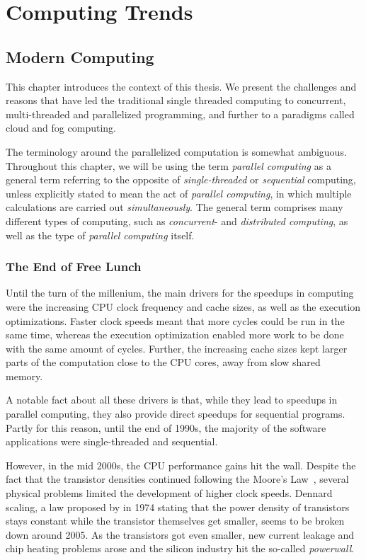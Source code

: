 \chapter{Computing Trends}
\label{chapter:computing-trends}

\section{Modern Computing}
This chapter introduces the context of this thesis. We present the challenges and reasons that have led the traditional single threaded computing to concurrent, multi-threaded and parallelized programming, and further to a paradigms called cloud and fog computing.

The terminology around the parallelized computation is somewhat ambiguous. Throughout this chapter, we will be using the term \emph{parallel computing} as a general term referring to the opposite of \emph{single-threaded} or \emph{sequential} computing, unless explicitly stated to mean the act of \emph{parallel computing}, in which multiple calculations are carried out \emph{simultaneously}. The general term comprises many different types of computing, such as \emph{concurrent}- and \emph{distributed computing}, as well as the type of \emph{parallel computing} itself.

\subsection{The End of Free Lunch}
\label{subsection:the-end-of-free-lunch}
Until the turn of the millenium, the main drivers for the speedups in computing were the increasing CPU clock frequency and cache sizes, as well as the execution optimizations. Faster clock speeds meant that more cycles could be run in the same time, whereas the execution optimization enabled more work to be done with the same amount of cycles. Further, the increasing cache sizes kept larger parts of the computation close to the CPU cores, away from slow shared memory.~\cite{Sutter:2005:FLiO}

A notable fact about all these drivers is that, while they lead to speedups in parallel computing, they also provide direct speedups for sequential programs. Partly for this reason, until the end of 1990s, the majority of the software applications were single-threaded and sequential.~\cite{Sutter:2005:FLiO}

However, in the mid 2000s, the CPU performance gains hit the wall. Despite the fact that the transistor densities continued following the Moore's Law~\cite{Moore:1998:MooresLaw}, several physical problems limited the development of higher clock speeds. Dennard scaling, a law proposed by in 1974 stating that the power density of transistors stays constant while the transistor themselves get smaller, seems to be broken down around 2005. As the transistors got even smaller, new current leakage and chip heating problems arose and the silicon industry hit the so-called \emph{powerwall}.~\cite{Esmaeilzadeh:2011:DSE, Sutter:2005:FLiO}

